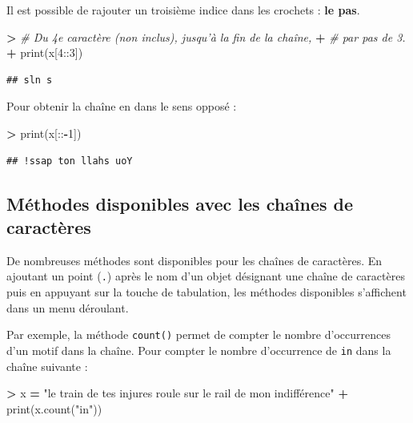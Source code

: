 \documentclass[12pt,]{book}
\newenvironment{Shaded}{\begin{snugshade}}{\end{snugshade}}
\newcommand{\DecValTok}[1]{\textcolor[rgb]{0.00,0.00,0.81}{#1}}
\newcommand{\StringTok}[1]{\textcolor[rgb]{0.31,0.60,0.02}{#1}}
\newcommand{\CommentTok}[1]{\textcolor[rgb]{0.56,0.35,0.01}{\textit{#1}}}
\newcommand{\OperatorTok}[1]{\textcolor[rgb]{0.81,0.36,0.00}{\textbf{#1}}}
\newcommand{\BuiltInTok}[1]{#1}
\newcommand{\NormalTok}[1]{#1}
\numberwithin{equation}{section}
\numberwithin{countremarque}{section}
\begin{document}
Il est possible de rajouter un troisième indice dans les crochets :
\textbf{le pas}.

\begin{Shaded}
\begin{Highlighting}[]
\OperatorTok{>} \CommentTok{# Du 4e caractère (non inclus), jusqu'à la fin de la chaîne,}
\OperatorTok{+} \CommentTok{# par pas de 3.}
\OperatorTok{+} \BuiltInTok{print}\NormalTok{(x[}\DecValTok{4}\NormalTok{::}\DecValTok{3}\NormalTok{])}
\end{Highlighting}
\end{Shaded}

\begin{lstlisting}
## sln s
\end{lstlisting}

Pour obtenir la chaîne en dans le sens opposé :

\begin{Shaded}
\begin{Highlighting}[]
\OperatorTok{>} \BuiltInTok{print}\NormalTok{(x[::}\OperatorTok{-}\DecValTok{1}\NormalTok{])}
\end{Highlighting}
\end{Shaded}

\begin{lstlisting}
## !ssap ton llahs uoY
\end{lstlisting}

\subsection{Méthodes disponibles avec les chaînes de
caractères}\label{methodes-disponibles-avec-les-chaines-de-caracteres}

De nombreuses méthodes sont disponibles pour les chaînes de caractères.
En ajoutant un point (\texttt{.}) après le nom d'un objet désignant une
chaîne de caractères puis en appuyant sur la touche de tabulation, les
méthodes disponibles s'affichent dans un menu déroulant.

Par exemple, la méthode \texttt{count()} permet de compter le nombre
d'occurrences d'un motif dans la chaîne. Pour compter le nombre
d'occurrence de \texttt{in} dans la chaîne suivante :

\begin{Shaded}
\begin{Highlighting}[]
\OperatorTok{>}\NormalTok{ x }\OperatorTok{=} \StringTok{"le train de tes injures roule sur le rail de mon indifférence"}
\OperatorTok{+} \BuiltInTok{print}\NormalTok{(x.count(}\StringTok{"in"}\NormalTok{))}
\end{Highlighting}
\end{Shaded}
\end{document}
